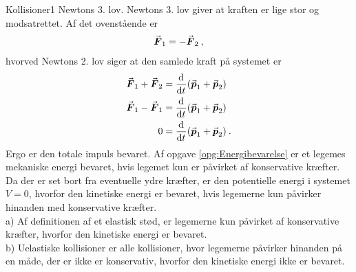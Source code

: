 %
%
\begin{opgave}{Kollisioner}{1}
\opg Newtons 3. lov.
\opg Newtons 3. lov giver at kraften er lige stor og modsatrettet.
\opg Af det ovenstående er
\begin{align*}
	{\vec{\boldsymbol{F}}}_1 = -{\vec{\boldsymbol{F}}}_2 \: ,
\end{align*}
hvorved Newtons 2. lov siger at den samlede kraft på systemet er
\begin{align*}
	{\vec{\boldsymbol{F}}}_1 + {\vec{\boldsymbol{F}}}_2 &= \frac{\mathrm{d}^{}{}}{{\mathrm{d} {t}}^{}}({\vec{\boldsymbol{p}}}_1 + {\vec{\boldsymbol{p}}}_2) \\
	{\vec{\boldsymbol{F}}}_1 - {\vec{\boldsymbol{F}}}_1 &= \frac{\mathrm{d}^{}{}}{{\mathrm{d} {t}}^{}}({\vec{\boldsymbol{p}}}_1 + {\vec{\boldsymbol{p}}}_2) \\
	0 &= \frac{\mathrm{d}^{}{}}{{\mathrm{d} {t}}^{}}({\vec{\boldsymbol{p}}}_1 + {\vec{\boldsymbol{p}}}_2) \: .
\end{align*}
Ergo er den totale impuls bevaret.
\opg Af opgave \ref{opg:Energibevarelse} er et legemes mekaniske energi bevaret, hvis legemet kun er påvirket af konservative kræfter. Da der er set bort fra eventuelle ydre kræfter, er den potentielle energi i systemet $V=0$, hvorfor den kinetiske energi er bevaret, hvis legemerne kun påvirker hinanden med konservative kræfter. \\
a) Af definitionen af et elastisk stød, er legemerne kun påvirket af konservative kræfter, hvorfor den kinetiske energi er bevaret. \\
b) Uelastiske kollisioner er alle kollisioner, hvor legemerne påvirker hinanden på en måde, der er ikke er konservativ, hvorfor den kinetiske energi ikke er bevaret.
\end{opgave}
%
%

